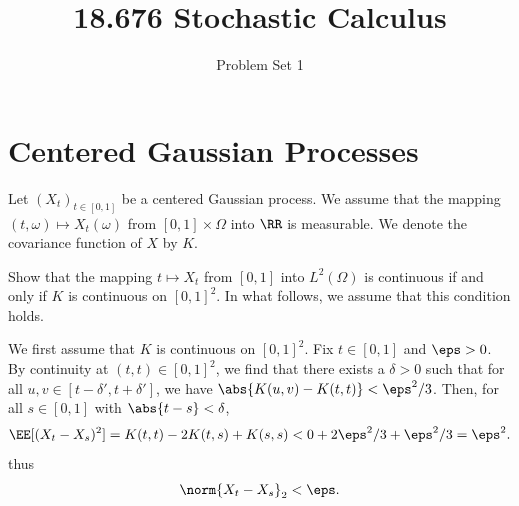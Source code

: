 \documentclass{scrartcl}
\title{18.676 Stochastic Calculus}
\subtitle{Problem Set 1}
\begin{document}
\section{Centered Gaussian Processes}

\begin{prob*}
    Let $(X_t)_{t \in [0,1]}$ be a centered Gaussian process. We assume that the mapping $(t,\omega) \mapsto X_t(\omega)$ from $[0,1] \times \Omega$ into $\RR$ is measurable. We denote the covariance function of $X$ by $K$.
\end{prob*}

\begin{prob}
    Show that the mapping $t \mapsto X_t$ from $[0,1]$ into $L^2(\Omega)$ is continuous if and only if $K$ is continuous on $[0,1]^2$. In what follows, we assume that this condition holds.
\end{prob}

We first assume that $K$ is continuous on $[0,1]^2$. Fix $t\in [0,1]$ and $\eps > 0$. By continuity at $(t,t)\in [0,1]^2$, we find that there exists a $\delta > 0$ such that for all $u, v \in [t - \delta', t + \delta']$, we have $\abs{K(u,v) - K(t,t)} < \eps^2 / 3$. Then, for all $s \in [0,1]$ with $\abs{t-s} < \delta$,
\[
    \EE[(X_t - X_s)^2] = K(t,t) - 2K(t,s) + K(s,s) < 0 + 2\eps^2/3 + \eps^2/3 = \eps^2.
\]
thus
\[
    \norm{X_t - X_s}_2 < \eps.
\]
\end{document}
